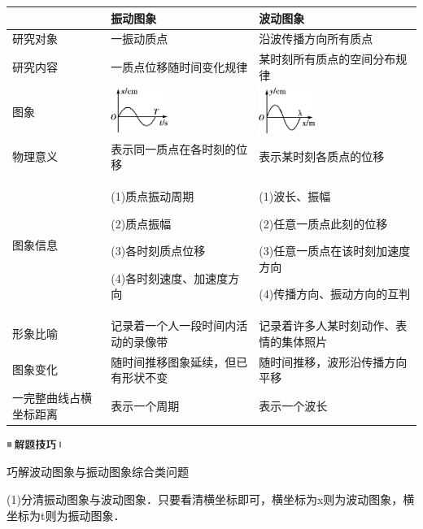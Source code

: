 \begin{longtable}[]{@{}lll@{}}
\toprule
& 振动图象 & 波动图象\tabularnewline
\midrule
\endhead
研究对象 & 一振动质点 & 沿波传播方向所有质点\tabularnewline
研究内容 & 一质点位移随时间变化规律 &
某时刻所有质点的空间分布规律\tabularnewline
图象 &
\includegraphics[width=0.72639in,height=0.57569in]{media/image532.png} &
\includegraphics[width=0.71667in,height=0.58472in]{media/image533.png}\tabularnewline
物理意义 & 表示同一质点在各时刻的位移 &
表示某时刻各质点的位移\tabularnewline
\begin{minipage}[t]{0.30\columnwidth}\raggedright
图象信息\strut
\end{minipage} & \begin{minipage}[t]{0.30\columnwidth}\raggedright
(1)质点振动周期

(2)质点振幅

(3)各时刻质点位移

(4)各时刻速度、加速度方向\strut
\end{minipage} & \begin{minipage}[t]{0.30\columnwidth}\raggedright
(1)波长、振幅

(2)任意一质点此刻的位移

(3)任意一质点在该时刻加速度方向

(4)传播方向、振动方向的互判\strut
\end{minipage}\tabularnewline
形象比喻 & 记录着一个人一段时间内活动的录像带 &
记录着许多人某时刻动作、表情的集体照片\tabularnewline
图象变化 & 随时间推移图象延续，但已有形状不变 &
随时间推移，波形沿传播方向平移\tabularnewline
一完整曲线占横坐标距离 & 表示一个周期 & 表示一个波长\tabularnewline
\bottomrule
\end{longtable}

\begin{center}\includegraphics[width=0.70764in,height=0.12292in]{media/image37.png}\end{center}
巧解波动图象与振动图象综合类问题

(1)分清振动图象与波动图象．只要看清横坐标即可，横坐标为x则为波动图象，横坐标为t则为振动图象．

